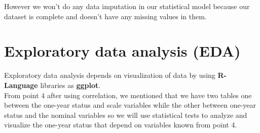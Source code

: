 \documentclass[a4paper, 11pt, oneside]{article} %
\begin{document}
However we won’t do any data imputation in our statistical model because our dataset is complete and doesn’t have any missing values in them.

\section{Exploratory data analysis (EDA)}
Exploratory data analysis depends on visualization of data by using \textbf { R-Language} libraries  as \textbf {ggplot}.\\
From point 4 after using correlation, we mentioned that we have two tables one between the one-year status and scale variables while the other between one-year status and the nominal variables so we will use statistical tests to analyze and visualize the one-year status that depend on variables known from point 4.\cite{datacamp} 
\end{document}
